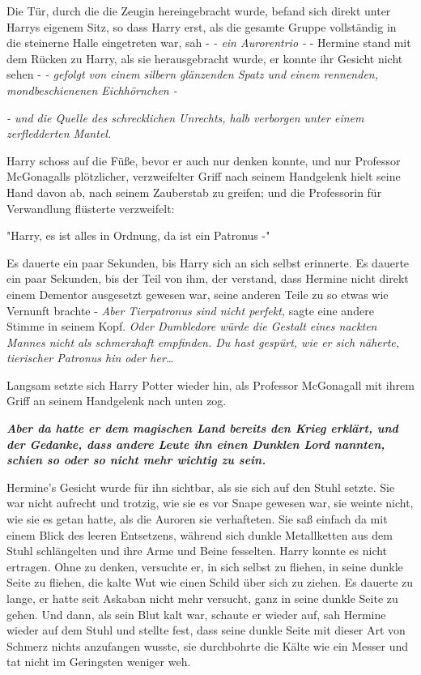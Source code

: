 {Die Tür, durch die die Zeugin hereingebracht wurde, befand sich direkt unter Harrys eigenem Sitz, so dass Harry erst, als die gesamte Gruppe vollständig in die steinerne Halle eingetreten war, sah - \emph{- ein Aurorentrio -} - Hermine stand mit dem Rücken zu Harry, als sie herausgebracht wurde, er konnte ihr Gesicht nicht sehen - \emph{- gefolgt von einem silbern glänzenden Spatz und einem rennenden, mondbeschienenen Eichhörnchen -}

\emph{- und die Quelle des schrecklichen Unrechts, halb verborgen unter einem zerfledderten Mantel.}

Harry schoss auf die Füße, bevor er auch nur denken konnte, und nur Professor McGonagalls plötzlicher, verzweifelter Griff nach seinem Handgelenk hielt seine Hand davon ab, nach seinem Zauberstab zu greifen; und die Professorin für Verwandlung flüsterte verzweifelt:

"Harry, es ist alles in Ordnung, da ist ein Patronus -"

Es dauerte ein paar Sekunden, bis Harry sich an sich selbst erinnerte. Es dauerte ein paar Sekunden, bis der Teil von ihm, der verstand, dass Hermine nicht direkt einem Dementor ausgesetzt gewesen war, seine anderen Teile zu so etwas wie Vernunft brachte - \emph{Aber Tierpatronus sind nicht perfekt,} sagte eine andere Stimme in seinem Kopf. \emph{Oder Dumbledore würde die Gestalt eines nackten Mannes nicht als schmerzhaft empfinden. Du hast gespürt, wie er sich näherte, tierischer Patronus hin oder her…}

Langsam setzte sich Harry Potter wieder hin, als Professor McGonagall mit ihrem Griff an seinem Handgelenk nach unten zog.

\textbf{\emph{Aber da hatte er dem magischen Land bereits den Krieg erklärt, und der Gedanke, dass andere Leute ihn einen Dunklen Lord nannten, schien so oder so nicht mehr wichtig zu sein.}}

Hermine's Gesicht wurde für ihn sichtbar, als sie sich auf den Stuhl setzte. Sie war nicht aufrecht und trotzig, wie sie es vor Snape gewesen war, sie weinte nicht, wie sie es getan hatte, als die Auroren sie verhafteten. Sie saß einfach da mit einem Blick des leeren Entsetzens, während sich dunkle Metallketten aus dem Stuhl schlängelten und ihre Arme und Beine fesselten. Harry konnte es nicht ertragen. Ohne zu denken, versuchte er, in sich selbst zu fliehen, in seine dunkle Seite zu fliehen, die kalte Wut wie einen Schild über sich zu ziehen. Es dauerte zu lange, er hatte seit Askaban nicht mehr versucht, ganz in seine dunkle Seite zu gehen. Und dann, als sein Blut kalt war, schaute er wieder auf, sah Hermine wieder auf dem Stuhl und stellte fest, dass seine dunkle Seite mit dieser Art von Schmerz nichts anzufangen wusste, sie durchbohrte die Kälte wie ein Messer und tat nicht im Geringsten weniger weh.

}

